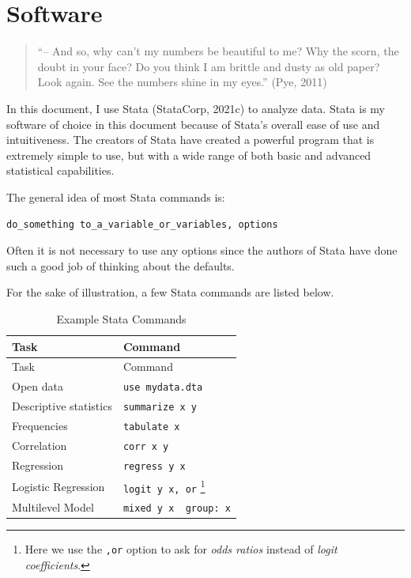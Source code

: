 \documentclass[
  letterpaper,
  DIV=11,
  numbers=noendperiod]{scrreprt}
\begin{document}

\hypertarget{sec-software}{%
\chapter{Software}\label{sec-software}}

\begin{quote}
``-- And so, why can't my numbers be beautiful to me? Why the scorn, the
doubt in your face? Do you think I am brittle and dusty as old paper?
Look again. See the numbers shine in my eyes.'' (Pye, 2011)
\end{quote}

In this document, I use Stata (StataCorp, 2021c) to analyze data. Stata
is my software of choice in this document because of Stata's overall
ease of use and intuitiveness. The creators of Stata have created a
powerful program that is extremely simple to use, but with a wide range
of both basic and advanced statistical capabilities.

The general idea of most Stata commands is:

\texttt{do\_something\ to\_a\_variable\_or\_variables,\ options}

Often it is not necessary to use any options since the authors of Stata
have done such a good job of thinking about the defaults.

For the sake of illustration, a few Stata commands are listed below.

\hypertarget{tbl-Statacommands}{}
\begin{longtable}[]{@{}ll@{}}
\caption{\label{tbl-Statacommands}Example Stata Commands}\tabularnewline
\toprule\noalign{}
Task & Command \\
\midrule\noalign{}
\endfirsthead
\toprule\noalign{}
Task & Command \\
\midrule\noalign{}
\endhead
\bottomrule\noalign{}
\endlastfoot
Open data & \texttt{use\ mydata.dta} \\
Descriptive statistics & \texttt{summarize\ x\ y} \\
Frequencies & \texttt{tabulate\ x} \\
Correlation & \texttt{corr\ x\ y} \\
Regression & \texttt{regress\ y\ x} \\
Logistic Regression & \texttt{logit\ y\ x,\ or} \footnote{Here we use
  the \texttt{,or} option to ask for \emph{odds ratios} instead of
  \emph{logit coefficients}.} \\
Multilevel Model &
\texttt{mixed\ y\ x\ \textbar{}\textbar{}\ group:\ x} \\
\end{longtable}
\end{document}

